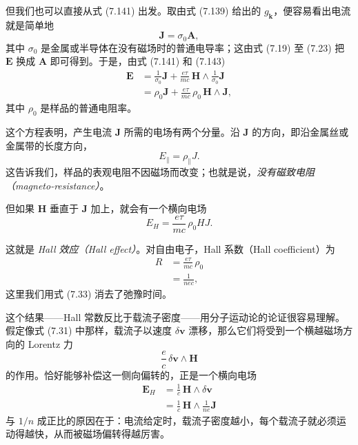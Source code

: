 但我们也可以直接从式 (7.141) 出发。取由式 (7.139) 给出的 $g_{\mathbf{k}}$，便容易看出电流就是简单地
\begin{equation*}
\mathbf{J}=\sigma_{0}\mathbf{A},\tag{7.143}
\end{equation*}
其中 $\sigma_{0}$ 是金属或半导体在没有磁场时的普通电导率；这由式 (7.19) 至 (7.23) 把 $\mathbf{E}$ 换成 $\mathbf{A}$ 即可得到。于是，由式 (7.141) 和 (7.143)
\begin{align*}
\mathbf{E}&=\frac{1}{\sigma_{0}}\mathbf{J}+\frac{e\tau}{mc}\,\mathbf{H}\wedge\frac{1}{\sigma_{0}}\mathbf{J}\\
&=\rho_{0}\mathbf{J}+\frac{e\tau}{mc}\,\rho_{0}\,\mathbf{H}\wedge\mathbf{J},\tag{7.144}
\end{align*}
其中 $\rho_{0}$ 是样品的普通电阻率。

这个方程表明，产生电流 $\mathbf{J}$ 所需的电场有两个分量。沿 $\mathbf{J}$ 的方向，即沿金属丝或金属带的长度方向，
\begin{equation*}
E_{\parallel}=\rho_{\parallel}J.\tag{7.145}
\end{equation*}
这告诉我们，样品的表观电阻不因磁场而改变；也就是说，\emph{没有磁致电阻（magneto-resistance）}。

但如果 $\mathbf{H}$ 垂直于 $\mathbf{J}$ 加上，就会有一个横向电场
\begin{equation*}
E_{H}=\frac{e\tau}{mc}\,\rho_{0}HJ.\tag{7.146}
\end{equation*}

这就是 \emph{Hall 效应（Hall effect）}。对自由电子，Hall 系数（Hall coefficient）为
\begin{align*}
R&=\frac{e\tau}{mc}\,\rho_{0}\\
&=\frac{1}{nec},\tag{7.147}
\end{align*}
这里我们用式 (7.33) 消去了弛豫时间。

这个结果——Hall 常数反比于载流子密度——用分子运动论的论证很容易理解。假定像式 (7.31) 中那样，载流子以速度 $\delta\mathbf{v}$ 漂移，那么它们将受到一个横越磁场方向的 Lorentz 力
\begin{equation*}
\frac{e}{c}\,\delta\mathbf{v}\wedge\mathbf{H}\tag{7.148}
\end{equation*}
的作用。恰好能够补偿这一侧向偏转的，正是一个横向电场
\begin{align*}
\mathbf{E}_{H}&=\frac{1}{c}\,\mathbf{H}\wedge\delta\mathbf{v}\\
&=\frac{1}{c}\,\mathbf{H}\wedge\frac{1}{ne}\mathbf{J}\tag{7.149}
\end{align*}
与 $1/n$ 成正比的原因在于：电流给定时，载流子密度越小，每个载流子就必须运动得越快，从而被磁场偏转得越厉害。

